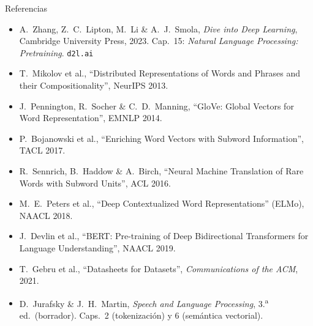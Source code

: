 \documentclass[aspectratio=169, 10pt]{beamer}
\begin{document}
\begin{frame}{Referencias}

	\small
	\begin{itemize}
		\item A.\ Zhang, Z.\ C.\ Lipton, M.\ Li \& A.\ J.\ Smola, \textit{Dive into Deep Learning}, Cambridge University Press, 2023. Cap.\ 15: \textit{Natural Language Processing: Pretraining}. \texttt{d2l.ai}
		\item T.\ Mikolov et al., ``Distributed Representations of Words and Phrases and their Compositionality'', NeurIPS 2013.
		\item J.\ Pennington, R.\ Socher \& C.\ D.\ Manning, ``GloVe: Global Vectors for Word Representation'', EMNLP 2014.
		\item P.\ Bojanowski et al., ``Enriching Word Vectors with Subword Information'', TACL 2017.
		\item R.\ Sennrich, B.\ Haddow \& A.\ Birch, ``Neural Machine Translation of Rare Words with Subword Units'', ACL 2016.
		\item M.\ E.\ Peters et al., ``Deep Contextualized Word Representations'' (ELMo), NAACL 2018.
		\item J.\ Devlin et al., ``BERT: Pre-training of Deep Bidirectional Transformers for Language Understanding'', NAACL 2019.
		\item T.\ Gebru et al., ``Datasheets for Datasets'', \textit{Communications of the ACM}, 2021.
		\item D.\ Jurafsky \& J.\ H.\ Martin, \textit{Speech and Language Processing}, 3.\textsuperscript{a} ed.\ (borrador). Caps.\ 2 (tokenizaci\'on) y 6 (sem\'antica vectorial).
	\end{itemize}

\end{frame}
\end{document}
